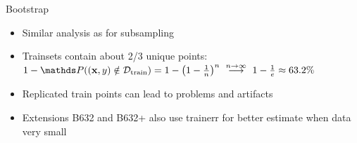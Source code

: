 \documentclass[11pt,compress,t,notes=noshow, xcolor=table]{beamer}
\begin{document}
\begin{vbframe}{Bootstrap}

\begin{itemize}
  \item Similar analysis as for subsampling
  \item Trainsets contain about 2/3 unique points:
      $1 - \P((\xv, y) \notin \Dtrain) = 1 - \left(1 - \frac{1}{n}\right)^n 
  \ \stackrel{n \to \infty}{\longrightarrow} \ 1-\frac{1}{e} \approx 63.2 \%$ 
\item Replicated train points can lead to problems and artifacts
\item Extensions B632 and B632+ also use trainerr for better estimate when data very small

\end{itemize}

\end{vbframe}
\end{document}
